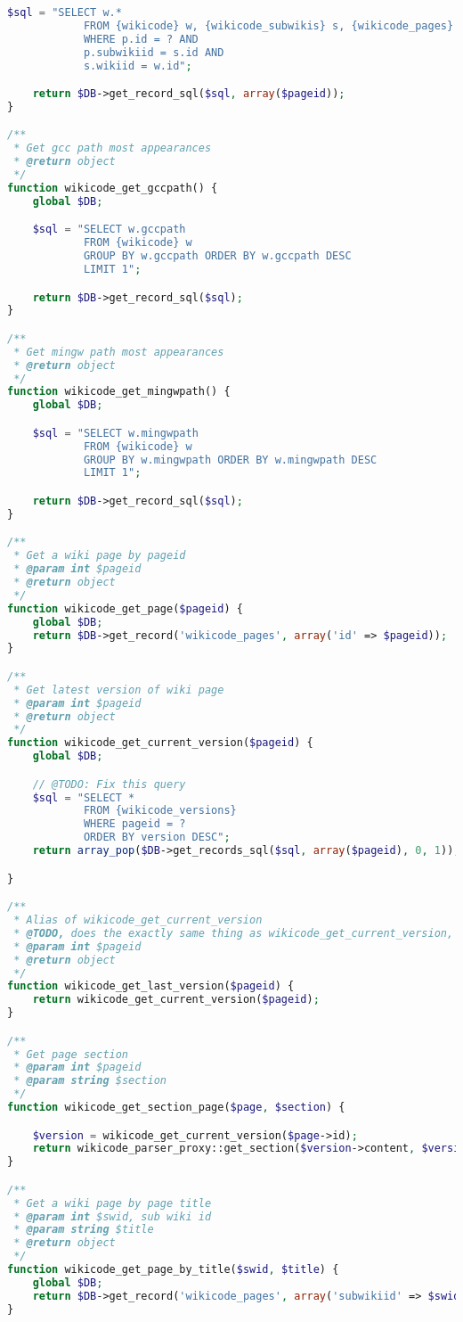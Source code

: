 \begin{lstlisting}[language=PHP]
    $sql = "SELECT w.*
            FROM {wikicode} w, {wikicode_subwikis} s, {wikicode_pages} p
            WHERE p.id = ? AND
            p.subwikiid = s.id AND
            s.wikiid = w.id";

    return $DB->get_record_sql($sql, array($pageid));
}

/**
 * Get gcc path most appearances
 * @return object
 */
function wikicode_get_gccpath() {
    global $DB;

    $sql = "SELECT w.gccpath
            FROM {wikicode} w
            GROUP BY w.gccpath ORDER BY w.gccpath DESC
            LIMIT 1";

    return $DB->get_record_sql($sql);
}

/**
 * Get mingw path most appearances
 * @return object
 */
function wikicode_get_mingwpath() {
    global $DB;

    $sql = "SELECT w.mingwpath
            FROM {wikicode} w
            GROUP BY w.mingwpath ORDER BY w.mingwpath DESC
            LIMIT 1";

    return $DB->get_record_sql($sql);
}

/**
 * Get a wiki page by pageid
 * @param int $pageid
 * @return object
 */
function wikicode_get_page($pageid) {
    global $DB;
    return $DB->get_record('wikicode_pages', array('id' => $pageid));
}

/**
 * Get latest version of wiki page
 * @param int $pageid
 * @return object
 */
function wikicode_get_current_version($pageid) {
    global $DB;

    // @TODO: Fix this query
    $sql = "SELECT *
            FROM {wikicode_versions}
            WHERE pageid = ?
            ORDER BY version DESC";
    return array_pop($DB->get_records_sql($sql, array($pageid), 0, 1));

}

/**
 * Alias of wikicode_get_current_version
 * @TODO, does the exactly same thing as wikicode_get_current_version, should be removed
 * @param int $pageid
 * @return object
 */
function wikicode_get_last_version($pageid) {
    return wikicode_get_current_version($pageid);
}

/**
 * Get page section
 * @param int $pageid
 * @param string $section
 */
function wikicode_get_section_page($page, $section) {

    $version = wikicode_get_current_version($page->id);
    return wikicode_parser_proxy::get_section($version->content, $version->contentformat, $section);
}

/**
 * Get a wiki page by page title
 * @param int $swid, sub wiki id
 * @param string $title
 * @return object
 */
function wikicode_get_page_by_title($swid, $title) {
    global $DB;
    return $DB->get_record('wikicode_pages', array('subwikiid' => $swid, 'title' => $title));
}


\end{lstlisting}
